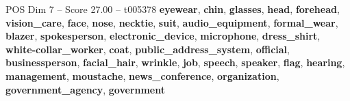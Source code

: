 \begin{textsample}{POS Dim 7 – Score 27.00 – t005378}  \label{ex:f7_pos_026}
\textbf{eyewear}, \textbf{chin}, \textbf{glasses}, \textbf{head}, \textbf{forehead}, \textbf{vision\_care}, \textbf{face}, \textbf{nose}, \textbf{necktie}, \textbf{suit}, \textbf{audio\_equipment}, \textbf{formal\_wear}, \textbf{blazer}, \textbf{spokesperson}, \textbf{electronic\_device}, \textbf{microphone}, \textbf{dress\_shirt}, \textbf{white-collar\_worker}, \textbf{coat}, \textbf{public\_address\_system}, \textbf{official}, \textbf{businessperson}, \textbf{facial\_hair}, \textbf{wrinkle}, \textbf{job}, \textbf{speech}, \textbf{speaker}, \textbf{flag}, \textbf{hearing}, \textbf{management}, \textbf{moustache}, \textbf{news\_conference}, \textbf{organization}, \textbf{government\_agency}, \textbf{government}

\end{textsample}
